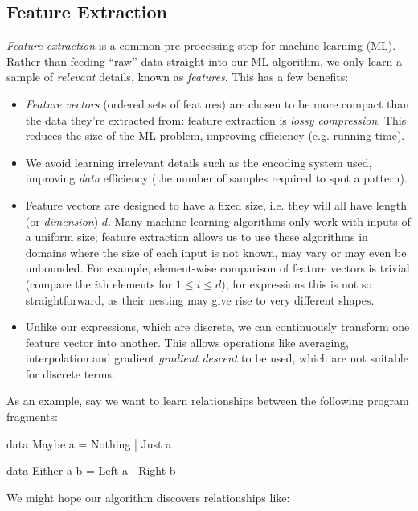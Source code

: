\subsection{Feature Extraction}

\emph{Feature extraction} is a common pre-processing step for machine learning
(ML). Rather than feeding ``raw'' data straight into our ML algorithm, we only
learn a sample of \emph{relevant} details, known as \emph{features}. This has
a few benefits:

\begin{itemize}
\item \emph{Feature vectors} (ordered sets of features) are chosen to be more
  compact than the data they're extracted from: feature extraction is
  \emph{lossy compression}. This reduces the size of the ML problem, improving
  efficiency (e.g. running time).
\item We avoid learning irrelevant details such as the encoding system used,
  improving \emph{data} efficiency (the number of samples required to spot a
  pattern).
\item Feature vectors are designed to have a fixed size, i.e. they will all have
  length (or \emph{dimension}) $d$. Many machine learning algorithms only work
  with inputs of a uniform size; feature extraction allows us to use these
  algorithms in domains where the size of each input is not known, may vary or
  may even be unbounded. For example, element-wise comparison of feature vectors
  is trivial (compare the $i$th elements for $1 \leq i \leq d$); for expressions
  this is not so straightforward, as their nesting may give rise to very
  different shapes.
\item Unlike our expressions, which are discrete, we can continuously transform
  one feature vector into another. This allows operations like averaging,
  interpolation and gradient \emph{gradient descent} to be used, which are not
  suitable for discrete terms.
\end{itemize}

As an example, say we want to learn relationships between the following program
fragments:

\begin{haskell}
data Maybe a = Nothing | Just a

data Either a b = Left a | Right b
\end{haskell}

We might hope our algorithm discovers relationships like:


